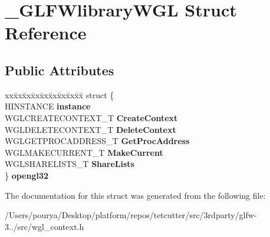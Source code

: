 \hypertarget{struct__GLFWlibraryWGL}{}\section{\+\_\+\+G\+L\+F\+Wlibrary\+W\+G\+L Struct Reference}
\label{struct__GLFWlibraryWGL}
\subsection*{Public Attributes}
\begin{DoxyCompactItemize}
\item 
\hypertarget{struct__GLFWlibraryWGL_a7e35a90f986ce3d6787883da2acc44d2}{}\begin{tabbing}
xx\=xx\=xx\=xx\=xx\=xx\=xx\=xx\=xx\=\kill
struct \{\\
\>HINSTANCE {\bfseries instance}\\
\>WGLCREATECONTEXT\_T {\bfseries CreateContext}\\
\>WGLDELETECONTEXT\_T {\bfseries DeleteContext}\\
\>WGLGETPROCADDRESS\_T {\bfseries GetProcAddress}\\
\>WGLMAKECURRENT\_T {\bfseries MakeCurrent}\\
\>WGLSHARELISTS\_T {\bfseries ShareLists}\\
\} {\bfseries opengl32}\label{struct__GLFWlibraryWGL_a7e35a90f986ce3d6787883da2acc44d2}
\\

\end{tabbing}\end{DoxyCompactItemize}


The documentation for this struct was generated from the following file\+:\begin{DoxyCompactItemize}
\item 
/\+Users/pourya/\+Desktop/platform/repos/tetcutter/src/3rdparty/glfw-\/3../src/wgl\+\_\+context.\+h\end{DoxyCompactItemize}

